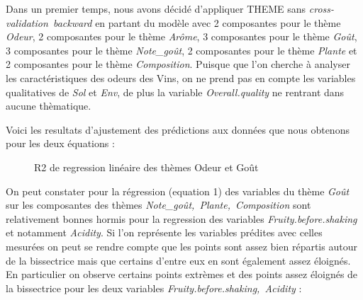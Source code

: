 \documentclass[a4paper,french,10pt]{article}
\begin{document}
Dans un premier temps, nous avons décidé d'appliquer THEME sans \textit{cross-validation~backward} en partant du modèle avec 2 composantes pour le thème \textit{Odeur}, 2 composantes pour le thème \textit{Arôme}, 3 composantes pour le thème \textit{Goût}, 3 composantes pour le thème \textit{Note\_goût}, 2 composantes pour le thème \textit{Plante} et 2 composantes pour le thème \textit{Composition}. Puisque que l'on cherche à analyser les caractéristiques des odeurs des Vins, on ne prend pas en compte les variables qualitatives de \textit{Sol} et \textit{Env}, de plus la variable \textit{Overall.quality} ne rentrant dans aucune thèmatique. \newline

Voici les resultats d'ajustement des prédictions aux données que nous obtenons pour les deux équations : 

\begin{figure}[htp] 
	\centering
	\hfill%
	\caption{R2 de regression linéaire des thèmes Odeur et Goût}
\end{figure}

On peut constater pour la régression (equation 1) des variables du thème \textit{Goût} sur les composantes des thèmes \textit{Note\_goût,~Plante,~Composition} sont relativement bonnes hormis pour la regression des variables \textit{Fruity.before.shaking} et notamment \textit{Acidity}. Si l'on représente les variables prédites avec celles mesurées on peut se rendre compte que les points sont assez bien répartis autour de la bissectrice mais que certains d'entre eux en sont également assez éloignés. En particulier on observe certains points extrèmes et des points assez éloignés de la bissectrice pour les deux variables \textit{Fruity.before.shaking,~Acidity} : 
\end{document}
